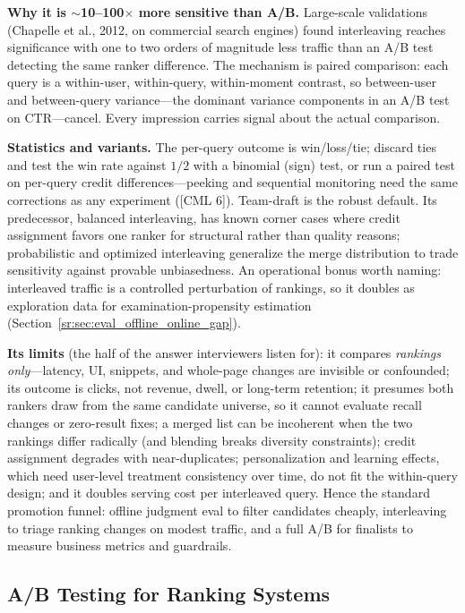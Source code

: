 \textbf{Why it is $\sim$10--100$\times$ more sensitive than A/B.} Large-scale validations (Chapelle et al., 2012, on commercial search engines) found interleaving reaches significance with one to two orders of magnitude less traffic than an A/B test detecting the same ranker difference. The mechanism is paired comparison: each query is a within-user, within-query, within-moment contrast, so between-user and between-query variance---the dominant variance components in an A/B test on CTR---cancel. Every impression carries signal about the actual comparison.

\textbf{Statistics and variants.} The per-query outcome is win/loss/tie; discard ties and test the win rate against $1/2$ with a binomial (sign) test, or run a paired test on per-query credit differences---peeking and sequential monitoring need the same corrections as any experiment ([CML 6]). Team-draft is the robust default. Its predecessor, balanced interleaving, has known corner cases where credit assignment favors one ranker for structural rather than quality reasons; probabilistic and optimized interleaving generalize the merge distribution to trade sensitivity against provable unbiasedness. An operational bonus worth naming: interleaved traffic is a controlled perturbation of rankings, so it doubles as exploration data for examination-propensity estimation (Section~\ref{sr:sec:eval_offline_online_gap}).

\textbf{Its limits} (the half of the answer interviewers listen for): it compares \textit{rankings only}---latency, UI, snippets, and whole-page changes are invisible or confounded; its outcome is clicks, not revenue, dwell, or long-term retention; it presumes both rankers draw from the same candidate universe, so it cannot evaluate recall changes or zero-result fixes; a merged list can be incoherent when the two rankings differ radically (and blending breaks diversity constraints); credit assignment degrades with near-duplicates; personalization and learning effects, which need user-level treatment consistency over time, do not fit the within-query design; and it doubles serving cost per interleaved query. Hence the standard promotion funnel: offline judgment eval to filter candidates cheaply, interleaving to triage ranking changes on modest traffic, and a full A/B for finalists to measure business metrics and guardrails.

\subsection{A/B Testing for Ranking Systems}


